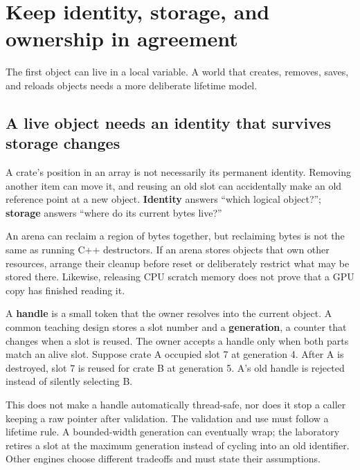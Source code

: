 \section{Keep identity, storage, and ownership in agreement}\label{05-engine-i-ch014-keep-identity-storage-and-ownership-in-agreement}

\hypertarget{05-engine-i-ch014-keep-identity-storage-and-ownership-in-agreement}{}

The first object can live in a local variable. A world that creates, removes, saves, and reloads objects needs a more deliberate lifetime model.

\subsection{A live object needs an identity that survives storage changes}\label{05-engine-i-ch014-a-live-object-needs-an-identity-that-survives-storage-changes}

\hypertarget{05-engine-i-ch014-a-live-object-needs-an-identity-that-survives-storage-changes}{}

A crate's position in an array is not necessarily its permanent identity. Removing another item can move it, and reusing an old slot can accidentally make an old reference point at a new object. \textbf{Identity} answers ``which logical object?''; \textbf{storage} answers ``where do its current bytes live?''

An arena can reclaim a region of bytes together, but reclaiming bytes is not the same as running C++ destructors. If an arena stores objects that own other resources, arrange their cleanup before reset or deliberately restrict what may be stored there. Likewise, releasing CPU scratch memory does not prove that a GPU copy has finished reading it.

A \textbf{handle} is a small token that the owner resolves into the current object. A common teaching design stores a slot number and a \textbf{generation}, a counter that changes when a slot is reused. The owner accepts a handle only when both parts match an alive slot. Suppose crate A occupied slot 7 at generation 4. After A is destroyed, slot 7 is reused for crate B at generation 5. A's old handle is rejected instead of silently selecting B.

This does not make a handle automatically thread-safe, nor does it stop a caller keeping a raw pointer after validation. The validation and use must follow a lifetime rule. A bounded-width generation can eventually wrap; the laboratory retires a slot at the maximum generation instead of cycling into an old identifier. Other engines choose different tradeoffs and must state their assumptions.


